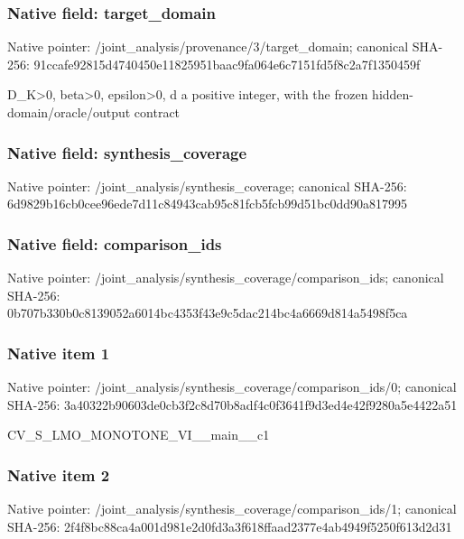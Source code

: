 \documentclass[10pt,a4paper]{article}
\begin{document}
\subsubsection{Native field: target\_\allowbreak{}domain}
Native pointer: /joint\_\allowbreak{}analysis/provenance/3/target\_\allowbreak{}domain; canonical SHA-256: 91ccafe92815d4740450e11825951baac9fa064e6c7151fd5f8c2a7f1350459f

\begingroup\raggedright\sloppy D\_\allowbreak{}K>0,\allowbreak{} beta>0,\allowbreak{} epsilon>0,\allowbreak{} d a positive integer,\allowbreak{} with the frozen hidden-domain/\allowbreak{}oracle/\allowbreak{}output contract\par\endgroup

\subsubsection{Native field: synthesis\_\allowbreak{}coverage}
Native pointer: /joint\_\allowbreak{}analysis/synthesis\_\allowbreak{}coverage; canonical SHA-256: 6d9829b16cb0cee96ede7d11c84943cab95c81fcb5fcb99d51bc0dd90a817995

\subsubsection{Native field: comparison\_\allowbreak{}ids}
Native pointer: /joint\_\allowbreak{}analysis/synthesis\_\allowbreak{}coverage/comparison\_\allowbreak{}ids; canonical SHA-256: 0b707b330b0c8139052a6014bc4353f43e9c5dac214bc4a6669d814a5498f5ca

\subsubsection{Native item 1}
Native pointer: /joint\_\allowbreak{}analysis/synthesis\_\allowbreak{}coverage/comparison\_\allowbreak{}ids/0; canonical SHA-256: 3a40322b90603de0cb3f2c8d70b8adf4c0f3641f9d3ed4e42f9280a5e4422a51

\begingroup\raggedright\sloppy CV\_\allowbreak{}S\_\allowbreak{}LMO\_\allowbreak{}MONOTONE\_\allowbreak{}VI\_\allowbreak{}\_\allowbreak{}main\_\allowbreak{}\_\allowbreak{}c1\par\endgroup

\subsubsection{Native item 2}
Native pointer: /joint\_\allowbreak{}analysis/synthesis\_\allowbreak{}coverage/comparison\_\allowbreak{}ids/1; canonical SHA-256: 2f4f8bc88ca4a001d981e2d0fd3a3f618ffaad2377e4ab4949f5250f613d2d31
\end{document}
